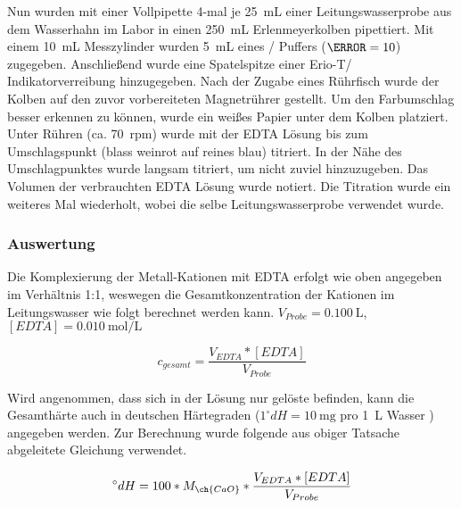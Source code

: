 \documentclass{article}
\begin{document}
        Nun wurden mit einer Vollpipette 4-mal je \SI[mode=text]{25}{\milli\liter} einer Leitungswasserprobe aus dem Wasserhahn im Labor in einen \SI[mode=text]{250}{\milli\liter} Erlenmeyerkolben pipettiert. Mit einem \SI[mode=text]{10}{\milli\liter} Messzylinder wurden \SI[mode=text]{5}{\milli\liter} eines / Puffers ($\pH=10$) zugegeben. Anschließend wurde eine Spatelspitze einer Erio-T/ Indikatorverreibung hinzugegeben. Nach der Zugabe eines Rührfisch wurde der Kolben auf den zuvor vorbereiteten Magnetrührer gestellt. Um den Farbumschlag besser erkennen zu können, wurde ein weißes Papier unter dem Kolben platziert.  Unter Rühren (ca. \SI[mode=text]{70}{rpm}) wurde mit der EDTA Lösung bis zum Umschlagspunkt (blass weinrot auf reines blau) titriert. In der Nähe des Umschlagpunktes wurde langsam titriert, um nicht zuviel hinzuzugeben. Das Volumen der verbrauchten EDTA Lösung wurde notiert. Die Titration wurde ein weiteres Mal wiederholt, wobei die selbe Leitungswasserprobe verwendet wurde.
        
      \subsubsection{Auswertung}
        
        Die Komplexierung der Metall-Kationen mit EDTA erfolgt wie oben angegeben im Verhältnis 1:1, weswegen die Gesamtkonzentration der Kationen im Leitungswasser wie folgt berechnet werden kann. $V_{Probe} = \SI[mode=text]{0.100}{\liter}$, $[EDTA] = \SI[mode=text]{0.010}{\mole\per\liter}$
        
        \begin{equation}
           c_{gesamt} = \frac{V_{EDTA} * [EDTA]}{V_{Probe}} \label{eq:ED}
        \end{equation}
         
        Wird angenommen, dass sich in der Lösung nur gelöste  befinden, kann die Gesamthärte auch in deutschen Härtegraden ($1 ^\circ dH = \SI[mode=text]{10}{\milli\gram}$  pro \SI[mode=text]{1}{\liter} Wasser \cite{deutscherharte}) angegeben werden. Zur Berechnung wurde folgende aus obiger Tatsache abgeleitete Gleichung verwendet.
        
        \begin{equation}
          ^\circ dH = 100 * M_{\ch{CaO}} * \frac{V_{EDTA} * [EDTA]}{V_{Probe}} \label{eq:Harte}
        \end{equation}              
        
\end{document}
